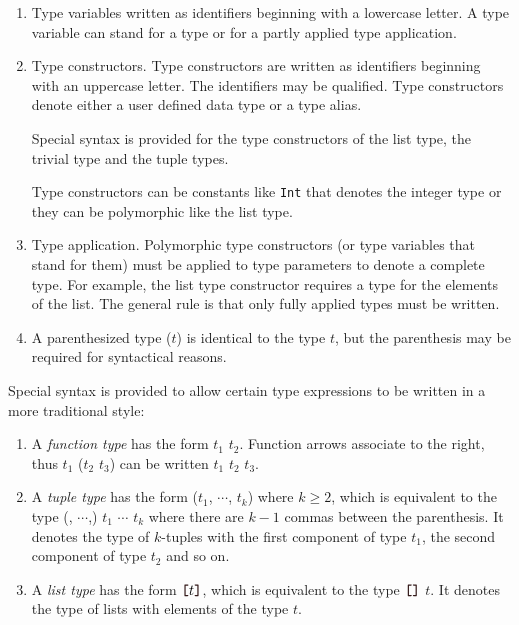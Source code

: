 \begin{enumerate}
\item Type variables written as identifiers beginning with a lowercase letter.  A type variable can stand for a type or for a partly applied type application.

\item Type constructors. Type constructors are written as identifiers beginning with an uppercase letter. The identifiers may be qualified. Type constructors denote either a user defined data type or a type alias.

Special syntax is provided for the type constructors of the list type, the trivial type and the tuple types.

Type constructors can be constants like \texttt{Int} that denotes the integer type or they can be polymorphic like the list type.
\item Type application. Polymorphic type constructors (or type variables that stand for them) must be applied to type parameters to denote a complete type. For example, the list type constructor requires a type for the elements of the list. The general rule is that only fully applied types must be written. 
\item A parenthesized type ($t$) is identical to the type $t$, but the parenthesis may be required for syntactical reasons.
\end{enumerate}

Special syntax is provided to allow certain type expressions to be written in a more traditional style:

\begin{enumerate}
\item A \emph{function type} has the form $t_1$ \arrow{} $t_2$. Function arrows associate to the right, thus $t_1$ \arrow{} ($t_2$ \arrow{} $t_3$) can be written $t_1$ \arrow{} $t_2$ \arrow{} $t_3$.
\item A \emph{tuple type} has the form ($t_1$, $\cdots$, $t_k$) where $k\ge{}2$, which is equivalent to the type (, $\cdots$,) $t_1$ $\cdots$ $t_k$ where there are $k-1$ commas between the parenthesis.
It denotes the type of $k$-tuples with the first component of type $t_1$, the second component of type $t_2$ and so on.
\item A \emph{list type} has the form $\bracka{}t\brackz{}$, which is equivalent to the type $\bracka{}\brackz{}$ $t$. It denotes the type of lists with elements of the type $t$.
\end{enumerate}

